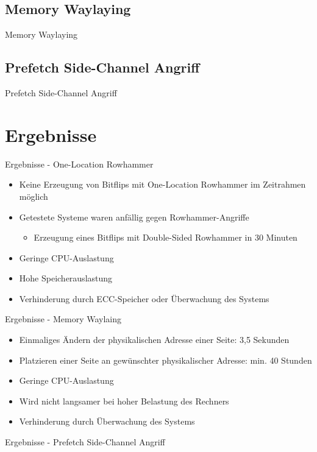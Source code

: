 \documentclass[german,10pt,xcolor=colortbl,compress
]{beamer}
\begin{document}
\subsection{Memory Waylaying}
\begin{frame}{Memory Waylaying}


\end{frame}

\subsection{Prefetch Side-Channel Angriff}
\begin{frame}{Prefetch Side-Channel Angriff}

\end{frame}

\section{Ergebnisse}
\begin{frame}{Ergebnisse - One-Location Rowhammer}
\begin{itemize}
\item Keine Erzeugung von Bitflips mit One-Location Rowhammer im Zeitrahmen möglich
\item Getestete Systeme waren anfällig gegen Rowhammer-Angriffe
	\begin{itemize}
	\item Erzeugung eines Bitflips mit Double-Sided Rowhammer in 30 Minuten
	\end{itemize}
\item Geringe CPU-Auslastung
\item Hohe Speicherauslastung
\item Verhinderung durch ECC-Speicher oder Überwachung des Systems
\end{itemize}

\end{frame}

\begin{frame}{Ergebnisse - Memory Waylaing}
\begin{itemize}
\item Einmaliges Ändern der physikalischen Adresse einer Seite: 3,5 Sekunden
\item Platzieren einer Seite an gewünschter physikalischer Adresse: min. 40 Stunden
\item Geringe CPU-Auslastung
\item Wird nicht langsamer bei hoher Belastung des Rechners
\item Verhinderung durch Überwachung des Systems
\end{itemize}

\end{frame}
\begin{frame}{Ergebnisse - Prefetch Side-Channel Angriff}

\end{frame}
\end{document}
